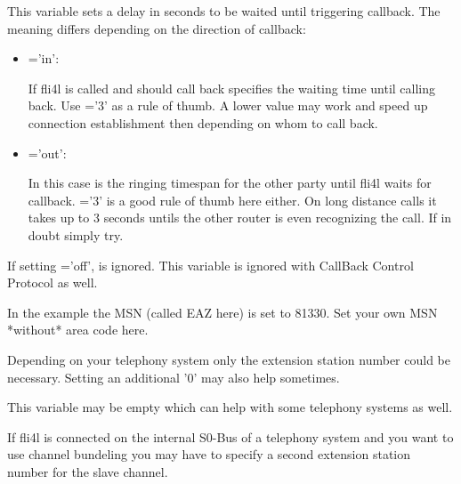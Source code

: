 \begin{description}
  
  This variable sets a delay in seconds to be waited until triggering callback. 
  The meaning differs depending on the direction of callback:
  
  \begin{itemize}
  \item  {}='in':
    
    If fli4l is called and should call back  specifies 
    the waiting time until calling back. Use ='3' 
    as a rule of thumb. A lower value may work and speed up connection establishment then 
    depending on whom to call back.
    
  \item {}='out':
    
    In this case  is the ringing timespan for the other 
    party until fli4l waits for callback. ='3' 
    is a good rule of thumb here either. On long distance calls it takes up 
    to 3 seconds untils the other router is even recognizing the call. If in 
    doubt simply try.
    
  \end{itemize}

  
  If setting ='off',
   is ignored.
  This variable is ignored with CallBack Control Protocol as well.



  In the example the MSN (called EAZ here) is set to 81330. Set your 
  own MSN *without* area code here.
  
  Depending on your telephony system only the extension station number 
  could be necessary. Setting an additional '0' may also help sometimes. 
  
  This variable may be empty which can help with some telephony systems as well. 
  
  
  If fli4l is connected on the internal S0-Bus of a telephony system and you 
  want to use channel bundeling you may have to specify a second extension 
  station number for the slave channel.
  

\end{description}
